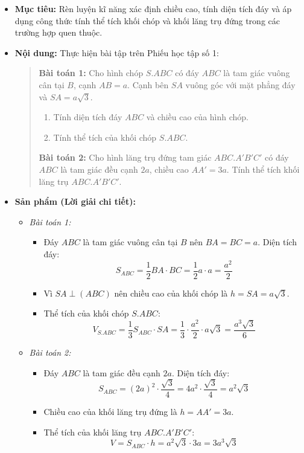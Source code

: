 \documentclass[12pt, a4paper]{article}
\begin{document}
\begin{itemize}[leftmargin=1.2cm]
    \item[a)] \textbf{Mục tiêu:} Rèn luyện kĩ năng xác định chiều cao, tính diện tích đáy và áp dụng công thức tính thể tích khối chóp và khối lăng trụ đứng trong các trường hợp quen thuộc.
    \item[b)] \textbf{Nội dung:} Thực hiện bài tập trên Phiếu học tập số 1:
    \begin{quote}
        \textbf{Bài toán 1:} Cho hình chóp $S.ABC$ có đáy $ABC$ là tam giác vuông cân tại $B$, cạnh $AB = a$. Cạnh bên $SA$ vuông góc với mặt phẳng đáy và $SA = a\sqrt{3}$.
        \begin{enumerate}
            \item Tính diện tích đáy $ABC$ và chiều cao của hình chóp.
            \item Tính thể tích của khối chóp $S.ABC$.
        \end{enumerate}
        \textbf{Bài toán 2:} Cho hình lăng trụ đứng tam giác $ABC.A'B'C'$ có đáy $ABC$ là tam giác đều cạnh $2a$, chiều cao $AA' = 3a$. Tính thể tích khối lăng trụ $ABC.A'B'C'$.
    \end{quote}

    \item[c)] \textbf{Sản phẩm (Lời giải chi tiết):}
    \begin{itemize}[leftmargin=0.6cm]
        \item \textit{Bài toán 1:}
        \begin{itemize}
            \item Đáy $ABC$ là tam giác vuông cân tại $B$ nên $BA = BC = a$.
            Diện tích đáy:
            $$S_{ABC} = \dfrac{1}{2} BA \cdot BC = \dfrac{1}{2} a \cdot a = \dfrac{a^2}{2}$$
            \item Vì $SA \perp (ABC)$ nên chiều cao của khối chóp là $h = SA = a\sqrt{3}$.
            \item Thể tích của khối chóp $S.ABC$:
            $$V_{S.ABC} = \dfrac{1}{3} S_{ABC} \cdot SA = \dfrac{1}{3} \cdot \dfrac{a^2}{2} \cdot a\sqrt{3} = \dfrac{a^3\sqrt{3}}{6}$$
        \end{itemize}

        \item \textit{Bài toán 2:}
        \begin{itemize}
            \item Đáy $ABC$ là tam giác đều cạnh $2a$.
            Diện tích đáy:
            $$S_{ABC} = (2a)^2 \cdot \dfrac{\sqrt{3}}{4} = 4a^2 \cdot \dfrac{\sqrt{3}}{4} = a^2\sqrt{3}$$
            \item Chiều cao của khối lăng trụ đứng là $h = AA' = 3a$.
            \item Thể tích của khối lăng trụ $ABC.A'B'C'$:
            $$V = S_{ABC} \cdot h = a^2\sqrt{3} \cdot 3a = 3a^3\sqrt{3}$$
        \end{itemize}
    \end{itemize}


\end{itemize}
\end{document}
